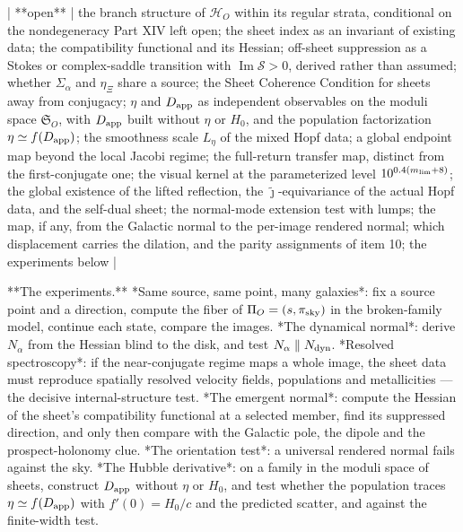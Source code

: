 | **open** | the branch structure of $\mathscr H_O$ within its regular strata, conditional on the nondegeneracy Part XIV left open; the sheet index as an invariant of existing data; the compatibility functional and its Hessian; off-sheet suppression as a Stokes or complex-saddle transition with $\operatorname{Im}\mathcal S>0$, derived rather than assumed; whether $\Sigma_\alpha$ and $\eta_\Xi$ share a source; the Sheet Coherence Condition for sheets away from conjugacy; $\eta$ and $D_{\rm app}$ as independent observables on the moduli space $\mathfrak S_O$, with $D_{\rm app}$ built without $\eta$ or $H_0$, and the population factorization $\eta\simeq f(D_{\rm app})$; the smoothness scale $L_\eta$ of the mixed Hopf data; a global endpoint map beyond the local Jacobi regime; the full-return transfer map, distinct from the first-conjugate one; the visual kernel at the parameterized level $10^{0.4(m_{\rm lim}+8)}$; the global existence of the lifted reflection, the $\widetilde\jmath$-equivariance of the actual Hopf data, and the self-dual sheet; the normal-mode extension test with lumps; the map, if any, from the Galactic normal to the per-image rendered normal; which displacement carries the dilation, and the parity assignments of item 10; the experiments below |

**The experiments.** *Same source, same point, many galaxies*: fix a source point and a direction, compute the fiber of $\Pi_O = (s,\pi_{\rm sky})$ in the broken-family model, continue each state, compare the images. *The dynamical normal*: derive $N_\alpha$ from the Hessian blind to the disk, and test $N_\alpha\parallel N_{\rm dyn}$. *Resolved spectroscopy*: if the near-conjugate regime maps a whole image, the sheet data must reproduce spatially resolved velocity fields, populations and metallicities — the decisive internal-structure test. *The emergent normal*: compute the Hessian of the sheet's compatibility functional at a selected member, find its suppressed direction, and only then compare with the Galactic pole, the dipole and the prospect-holonomy clue. *The orientation test*: a universal rendered normal fails against the sky. *The Hubble derivative*: on a family in the moduli space of sheets, construct $D_{\rm app}$ without $\eta$ or $H_0$, and test whether the population traces $\eta\simeq f(D_{\rm app})$ with $f'(0) = H_0/c$ and the predicted scatter, and against the finite-width test.

